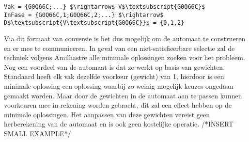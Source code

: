 \begin{lstlisting}[mathescape, caption=IDP Syntax conversion, frame=single]
Vak = {G0Q66C;...} $\rightarrow$ V$\textsubscript{G0Q66C}$
InFase = {G0Q66C,1;G0Q66C,2;...} $\rightarrow$ D$\textsubscript{V\textsubscript{G0Q66C}}$ = {0,1,2}
\end{lstlisting}

Via dit formaat van conversie is het dus mogelijk om de automaat te construeren en er mee te communiceren. In geval van een niet-satisfieerbare selectie zal de techniek volgens Amilhastre alle minimale oplossingen zoeken voor het probleem. Nog een voordeel van de automaat is dat ze werkt op basis van gewichten. Standaard heeft elk vak dezelfde voorkeur (gewicht) van 1, hierdoor is een minimale oplossing een oplossing waarbij zo weinig mogelijk keuzes ongedaan gemaakt worden. Maar door de gewichten in de automaat aan te passen kunnen voorkeuren mee in rekening worden gebracht, dit zal een effect hebben op de minimale oplossingen. Het aanpassen van deze gewichten vereist geen herberekening van de automaat en is ook geen kostelijke operatie. /*INSERT SMALL EXAMPLE*/